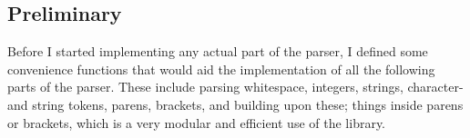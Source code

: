 %
%

\subsection{Preliminary}
Before I started implementing any actual part of the parser, I defined some
convenience functions that would aid the implementation of all the following
parts of the parser. These include parsing whitespace, integers, strings,
character- and string tokens, parens, brackets, and building upon these;
things inside parens or brackets, which is a very modular and efficient use of
the library.
